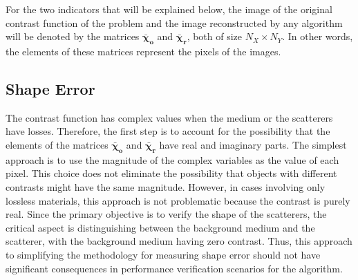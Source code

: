 \documentclass{IEEEtran}
\newcommand{\Xo}{\boldsymbol{\bar{\chi}_o}}
\newcommand{\Xr}{\boldsymbol{\bar{\chi}_r}}
\begin{document}
		For the two indicators that will be explained below, the image of the original contrast function of the problem and the image reconstructed by any algorithm will be denoted by the matrices $\Xo$ and $\Xr$, both of size $N_X \times N_Y$. In other words, the elements of these matrices represent the pixels of the images.

	
		\subsection{Shape Error}\label{sec:indicators:shapeerror}
		
			
			The contrast function has complex values when the medium or the scatterers have losses. Therefore, the first step is to account for the possibility that the elements of the matrices $\Xo$ and $\Xr$ have real and imaginary parts. The simplest approach is to use the magnitude of the complex variables as the value of each pixel. This choice does not eliminate the possibility that objects with different contrasts might have the same magnitude. However, in cases involving only lossless materials, this approach is not problematic because the contrast is purely real. Since the primary objective is to verify the shape of the scatterers, the critical aspect is distinguishing between the background medium and the scatterer, with the background medium having zero contrast. Thus, this approach to simplifying the methodology for measuring shape error should not have significant consequences in performance verification scenarios for the algorithm.
			
\end{document}
